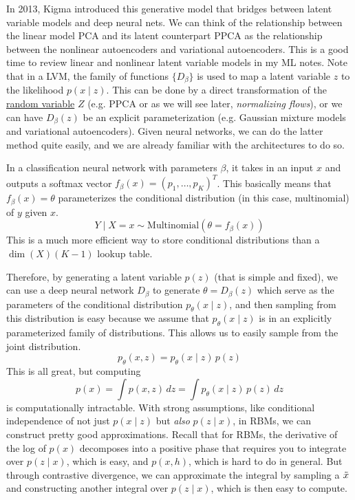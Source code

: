   In 2013, Kigma introduced this generative model that bridges between latent variable models and deep neural nets. We can think of the relationship between the linear model PCA and its latent counterpart PPCA as the relationship between the nonlinear autoencoders and variational autoencoders. This is a good time to review linear and nonlinear latent variable models in my ML notes. Note that in a LVM, the family of functions $\{D_\beta\}$ is used to map a latent variable $z$ to the likelihood $p(x \mid z)$. This can be done by a direct transformation of the \hyperref[prob-def:random-variable]{random variable} $Z$ (e.g. PPCA or as we will see later, \textit{normalizing flows}), or we can have $D_\beta(z)$ be an explicit parameterization (e.g. Gaussian mixture models and variational autoencoders). Given neural networks, we can do the latter method quite easily, and we are already familiar with the architectures to do so. 

  \begin{example}
    \label{ex:classification-nets-parameterize-multinomials}
    In a classification neural network with parameters $\beta$, it takes in an input $x$ and outputs a softmax vector $f_\beta (x) =(p_1, \ldots, p_K)^T$. This basically means that $f_\beta (x) = \theta$ parameterizes the conditional distribution (in this case, multinomial) of $y$ given $x$. 
    \begin{equation}
      Y \mid X = x \sim \mathrm{Multinomial}(\theta = f_\beta (x))
    \end{equation}
    This is a much more efficient way to store conditional distributions than a $\dim(X) (K - 1)$ lookup table. 
  \end{example}

  Therefore, by generating a latent variable $p(z)$ (that is simple and fixed), we can use a deep neural network $D_\beta$ to generate $\theta = D_\beta (z)$ which serve as the parameters of the conditional distribution $p_\theta (x \mid z)$, and then sampling from this distribution is easy because we assume that $p_\theta (x \mid z)$ is in an explicitly parameterized family of distributions. This allows us to easily sample from the joint distribution. 
  \begin{equation}
    p_\theta (x, z) = p_\theta (x \mid z) \, p(z)
  \end{equation}
  This is all great, but computing 
  \begin{equation}
    p(x) = \int p(x, z) \,dz = \int p_\theta (x \mid z) \, p(z) \,dz
  \end{equation}
  is computationally intractable. With strong assumptions, like conditional independence of not just $p(x \mid z)$ but \textit{also} $p(z \mid x)$, in RBMs, we can construct pretty good approximations. Recall that for RBMs, the derivative of the log of $p(x)$ decomposes into a positive phase that requires you to integrate over $p(z \mid x)$, which is easy, and $p(x, h)$, which is hard to do in general. But through contrastive divergence, we can approximate the integral by sampling a $\Tilde{x}$ and constructing another integral over $p(z \mid x)$, which is then easy to compute. 

